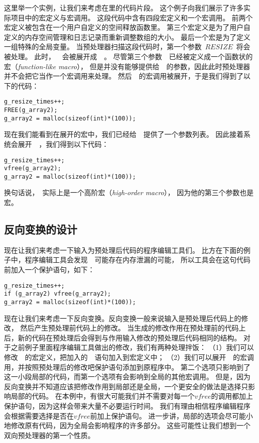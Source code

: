 这里举一个实例，让我们来考虑在里的代码片段。
这个例子向我们展示了许多实际项目中的宏定义与宏调用。
这段代码中含有四段宏定义和一个宏调用。
前两个宏定义被包含在一个用户自定义的空间释放函数里。
第三个宏定义是为了用户自定义的内存空间管理和日志记录而重新调整数组的大小。
最后一个宏是为了定义一组特殊的全局变量。
当预处理器扫描这段代码时，第一个参数~$RESIZE$~将会被处理。
此时，~~会被展开成~~。
尽管第三个参数~~已经被定义成一个函数状的宏（\emph{function-like macro}），
但是并没有能够提供给~~的参数，因此此时预处理器并不会把它当作一个宏调用来处理。
然后~~的宏调用被展开，于是我们得到了以下的代码：
\begin{lstlisting}
g_resize_times++;
FREE(g_array2);
g_array2 = malloc(sizeof(int)*(100));
\end{lstlisting}
现在我们能看到在展开的宏中，我们已经给~~提供了一个参数列表。
因此接着系统会展开~~，我们得到以下代码：
\begin{lstlisting}
g_resize_times++;
vfree(g_array2);
g_array2 = malloc(sizeof(int)*(100));
\end{lstlisting}
换句话说，~实际上是一个高阶宏（\emph{high-order macro}），
因为他的第三个参数也是宏。

\subsection{反向变换的设计}
现在让我们来考虑一下输入为预处理后代码的程序编辑工具们。
比方在下面的例子中，程序编辑工具会发现~~可能存在内存泄漏的可能，
所以工具会在这句代码前加入一个保护语句，如下：
\begin{lstlisting}
g_resize_times++;
if (g_array2) vfree(g_array2);
g_array2 = malloc(sizeof(int)*(100));
\end{lstlisting}

现在让我们来考虑一下反向变换。反向变换一般来说输入是预处理后代码上的修改，
然后产生预处理前代码上的修改。
当生成的修改作用在预处理前的代码上后，新的代码在预处理后会得到与作用输入修改的预处理后代码相同的结构。
对于之前例子里面程序编辑工具做出的修改，我们有两种处理拌饭：
（1）我们可以修改~~的宏定义，把加入的~~语句加入到宏定义中；
（2）我们可以展开~~的宏调用，并按照预处理后的修改吧保护语句添加到原程序中。
第二个选项只影响到了这一小段局部的代码，而第一个选项有会影响到全局的其他宏调用。
但是，因为反向变换并不知道应该把修改作用到局部还是全局，一个更安全的做法是选择只影响局部的代码。
在本例中，有很大可能我们并不需要对每一个$vfree$的调用都加上保护语句，因为这样会带来大量不必要运行时间。
我们有理由相信程序编辑程序会根据需要选择是否在$vfree$前加上保护语句。
进一步讲，局部的选项会尽可能小地修改原有代码，因为全局会影响程序的许多部分。
这些可能性让我们想到一个双向预处理器的第一个性质。


